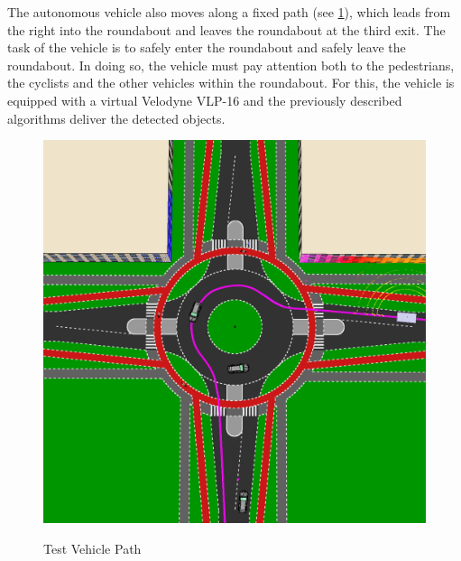 \documentclass[11pt,oneside,openright]{mpreport}
\begin{document}

The autonomous vehicle also moves along a fixed path (see \cref{mycar_path}), which leads from the right into the roundabout and leaves the roundabout at the third exit. 
The task of the vehicle is to safely enter the roundabout and safely leave the roundabout. In doing so, the vehicle must pay attention both to the pedestrians,
the cyclists and the other vehicles within the roundabout. For this, the vehicle is equipped with a virtual Velodyne VLP-16 and the previously described algorithms deliver the detected objects.

\begin{figure}[!ht]
\begin{center}
\caption{Test Vehicle Path}
\includegraphics[width=\textwidth]{bilder/mycar_path.png}
\label{mycar_path}
\end{center}
\end{figure}
\end{document}
